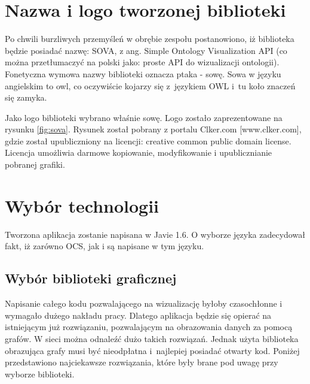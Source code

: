 \section{Nazwa i logo tworzonej biblioteki}

Po chwili burzliwych przemyśleń w obrębie zespołu postanowiono, iż biblioteka będzie posiadać nazwę: SOVA, z ang. Simple Ontology Visualization API (co można przetłumaczyć 
na polski jako: proste API do wizualizacji ontologii). Fonetyczna wymowa nazwy biblioteki oznacza ptaka - sowę. Sowa w języku angielskim to owl, co oczywiście kojarzy się 
z~językiem OWL i~tu koło znaczeń się zamyka. 
\par Jako logo biblioteki wybrano właśnie sowę. Logo zostało zaprezentowane na rysunku \ref{fig:sova}. Rysunek został pobrany z portalu Clker.com [www.clker.com], gdzie został 
upubliczniony na licencji: creative common public domain license. Licencja umożliwia darmowe kopiowanie, modyfikowanie i upublicznianie pobranej grafiki.



\section{Wybór technologii}

Tworzona aplikacja zostanie napisana w Javie 1.6. O wyborze języka zadecydował fakt, iż zarówno OCS, jak i \proteges są napisane w tym języku. 
\subsection{Wybór biblioteki graficznej}
Napisanie całego kodu pozwalającego na wizualizację byłoby czasochłonne i wymagało dużego nakładu pracy. Dlatego aplikacja będzie się opierać na istniejącym już rozwiązaniu, 
 pozwalającym na obrazowania danych za pomocą grafów. W sieci można odnaleźć dużo takich rozwiązań. Jednak użyta biblioteka obrazująca grafy musi być nieodpłatna i~najlepiej 
posiadać otwarty kod. Poniżej przedstawiono najciekawsze rozwiązania, które były brane pod uwagę przy wyborze biblioteki. 

